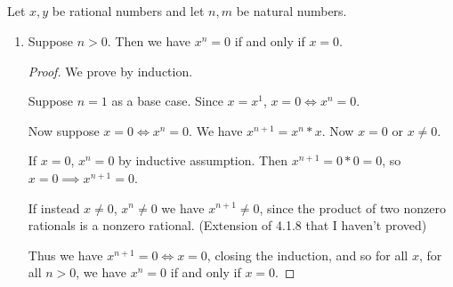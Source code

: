 \documentclass[../../main.tex]{subfiles}
\begin{document}

\addtocounter{subsection}{2}
\subsection{}
\begin{q}
    Let $x, y$ be rational numbers and let $n, m$ be natural numbers. 
\end{q}
\begin{enumerate}
    \addtocounter{enumi}{1}
    \item
    \begin{q}
        Suppose $n > 0$. Then we have $x^n = 0$ if and only if $x = 0$.
    \end{q}
    
    \begin{proof}
        We prove by induction.

        Suppose $n = 1$ as a base case.
        Since $x = x^1$, $x = 0 \iff x^n = 0$.
        
        Now suppose $x = 0 \iff x^n = 0$. 
        We have $x^{n+1} = x^n * x$.
        Now $x = 0$ or $x \neq 0$.
        
        If $x = 0$, $x^n = 0$ by inductive assumption. 
        Then $x^{n+1} = 0 * 0 = 0$, so $x = 0 \implies x^{n+1} = 0$.

        If instead $x \neq 0$, $x^n \neq 0$ we have $x^{n+1} \neq 0$, since the product of two nonzero rationals is a nonzero rational. (Extension of 4.1.8 that I haven't proved)

        Thus we have $x^{n+1} = 0 \iff x = 0$, closing the induction, and so for all $x$, for all $n > 0$, we have $x^n = 0$ if and only if $x = 0$.
    \end{proof}
\end{enumerate}\begin{q}
    
\end{q}
\end{document}

